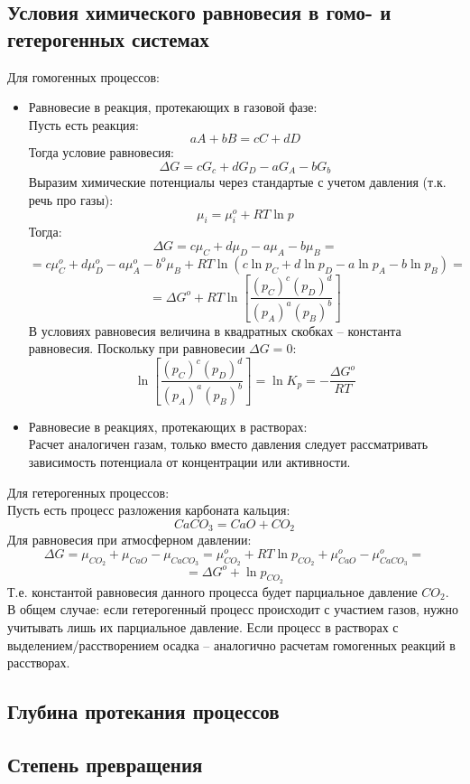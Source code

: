\documentclass[14pt,a4paper]{scrartcl}
\begin{document}
\subsection*{Условия химического равновесия в гомо- и гетерогенных системах}
Для гомогенных процессов:
\begin{itemize}
	\item Равновесие в реакция, протекающих в газовой фазе: \\
	Пусть есть реакция:
	$$ aA + bB = cC +  dD $$
	Тогда условие равновесия:
	$$ \Delta{G} = cG_c + dG_D - aG_A - bG_b $$
	Выразим химические потенциалы через стандартые с учетом давления (т.к. речь про газы):
	$$ \mu_i = \mu^o_i + RT \ln{p} $$
	Тогда:
	$$ \Delta{G} = c\mu_C + d\mu_D - a\mu_A - b\mu_B = $$
	$$ =c\mu^o_C + d\mu^o_D - a\mu^o_A - b^o\mu_B + RT \ln{(c\ln{p_C} + d\ln{p_D} - a\ln{p_A} - b\ln{p_B})} = $$
	$$ = \Delta{G^o} + RT \ln{\left[ \dfrac{(p_C)^c(p_D)^d}{(p_A)^a(p_B)^b}\right]} $$
	В условиях равновесия величина в квадратных скобках -- константа равновесия. Поскольку при равновесии $\Delta{G} = 0$:
	$$ \ln{\left[ \dfrac{(p_C)^c(p_D)^d}{(p_A)^a(p_B)^b}\right]} = \ln{K_p} = - \dfrac{\Delta{G^o}}{RT}  $$
	\item Равновесие в реакциях, протекающих в растворах:\\
	Расчет аналогичен газам, только вместо давления следует рассматривать зависимость потенциала от концентрации или активности.
\end{itemize}
Для гетерогенных процессов: \\
Пусть есть процесс разложения карбоната кальция:
$$ CaCO_3 = CaO + CO_2 $$
Для равновесия при атмосферном давлении:
$$ \Delta{G} = \mu_{CO_2} + \mu_{CaO} - \mu_{CaCO_3} = \mu_{CO_2}^o + RT \ln{p_{CO_2}} + \mu_{CaO}^o - \mu_{CaCO_3}^o = $$
$$ = \Delta{G^o} + \ln{p_{CO_2}} $$
Т.е. константой равновесия данного процесса будет парциальное давление $CO_2$. \\
В общем случае: если гетерогенный процесс происходит с участием газов, нужно учитывать лишь  их парциальное давление. Если процесс в растворах с выделением/расстворением осадка -- аналогично расчетам гомогенных реакций в расстворах.
\subsection*{Глубина протекания процессов}

\subsection*{Степень превращения}
\end{document}
